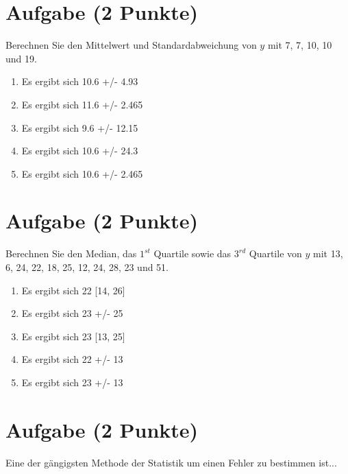 \documentclass[a4paper, 10pt]{scrartcl}\usepackage[]{graphicx}\usepackage[]{xcolor}
\begin{document}
\section{Aufgabe \hfill (2 Punkte)}




Berechnen Sie den Mittelwert und Standardabweichung von $y$ mit 7, 7, 10, 10 und 19.



\begin{enumerate}
\item [\textbf{A} \msquare] Es ergibt sich 10.6 +/- 4.93
\item [\textbf{B} \msquare] Es ergibt sich 11.6 +/- 2.465
\item [\textbf{C} \msquare] Es ergibt sich 9.6 +/- 12.15
\item [\textbf{D} \msquare] Es ergibt sich 10.6 +/- 24.3
\item [\textbf{E} \msquare] Es ergibt sich 10.6 +/- 2.465
\end{enumerate} 

\section{Aufgabe \hfill (2 Punkte)}




Berechnen Sie den Median, das $1^{st}$ Quartile sowie das $3^{rd}$ Quartile von $y$ mit 13, 6, 24, 22, 18, 25, 12, 24, 28, 23 und 51.



\begin{enumerate}
\item [\textbf{A} \msquare] Es ergibt sich 22 [14, 26]
\item [\textbf{B} \msquare] Es ergibt sich 23 +/- 25
\item [\textbf{C} \msquare] Es ergibt sich 23 [13, 25]
\item [\textbf{D} \msquare] Es ergibt sich 22 +/- 13
\item [\textbf{E} \msquare] Es ergibt sich 23 +/- 13
\end{enumerate}

\section{Aufgabe \hfill (2 Punkte)}

Eine der g{\"a}ngigsten Methode der Statistik um einen Fehler zu bestimmen ist...
\end{document}
